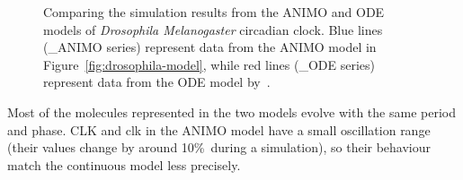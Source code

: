 \begin{figure}[!htb]
\begin{minipage}{\textwidth}
\begin{tabular}{ccc}
\end{tabular}
\caption{Comparing the simulation results from the ANIMO and ODE models of
\emph{Drosophila Melanogaster} circadian clock. Blue lines ({\sf \_{}ANIMO} series)
represent data from the ANIMO model in Figure~\ref{fig:drosophila-model},
while red lines ({\sf \_{}ODE} series) represent data from the ODE model by~\citet{drosophila-ode-model}.\label{suppl-fig:grafici-drosophila}}
\end{minipage}
\end{figure}

Most of the molecules represented in the two models evolve with the same period and phase.
CLK and clk in the ANIMO model have
a small oscillation range (their values change by around 10\%\ during a simulation),
so their behaviour match the continuous model less precisely.
%
%
%
